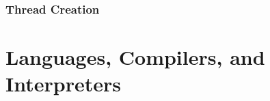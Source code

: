 \documentclass[11pt]{article} %
\begin{document}
\subsubsection{Thread Creation}



\section{Languages, Compilers, and Interpreters}

\end{document}
